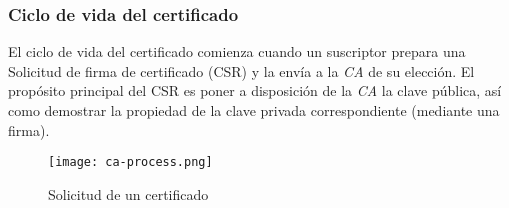 \subsubsection*{Ciclo de vida del certificado}

El ciclo de vida del certificado comienza cuando un suscriptor prepara una 
Solicitud de firma de certificado (CSR) y la envía a la \emph{CA} de su elección. 
El propósito principal del CSR es poner a disposición de la \emph{CA} la clave 
pública, así como demostrar la propiedad de la clave privada correspondiente 
(mediante una firma). 


\begin{center}
    \begin{figure}   
       \begin{center}
          \texttt{[image: ca-process.png]}
       \end{center}
       \caption{Solicitud de un certificado}
       \label{figSolCert}
    \end{figure}
 \end{center}

